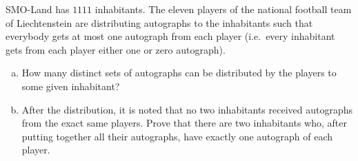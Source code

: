 SMO-Land has $1111$ inhabitants. The eleven players of the national football team of Liechtenstein
are distributing autographs to the inhabitants such that everybody gets at most one
autograph from each player (i.e.\ every inhabitant gets from each player either one or zero autograph).
\begin{enumerate}[a)] 
\item How many distinct sets of autographs can be distributed by the players to some given inhabitant?
\item After the distribution, it is noted that no two inhabitants received autographs from the exact same players. Prove that there are two inhabitants who, after putting together all their autographs, have exactly one autograph of each player.
\end{enumerate}
